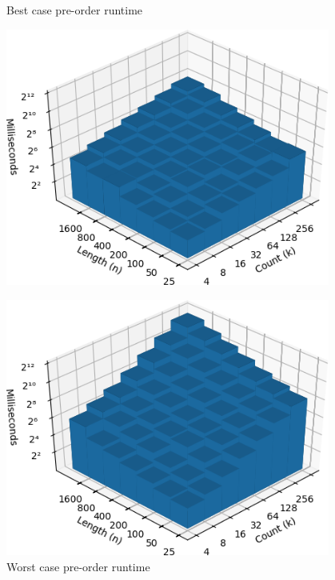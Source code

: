 \documentclass{bmcart}
\begin{document}
\begin{backmatter}
	\begin{figure}[h]
		\centering
		\begin{minipage}{0.48\textwidth}
			\centering
			\caption{Best case pre-order runtime}
			\label{Fig:Best}
			\includegraphics[width=0.95\textwidth]{pathological-12-preorder.png}
		\end{minipage}
		\hfill
		\begin{minipage}{0.48\textwidth}
			\centering
			\caption{Worst case pre-order runtime}
			\label{Fig:Worst}
			\includegraphics[width=0.95\textwidth]{pathological-31-preorder.png}
		\end{minipage}

		\begin{minipage}{0.48\textwidth}
			

\end{minipage}
\end{figure}
\end{backmatter}
\end{document}
